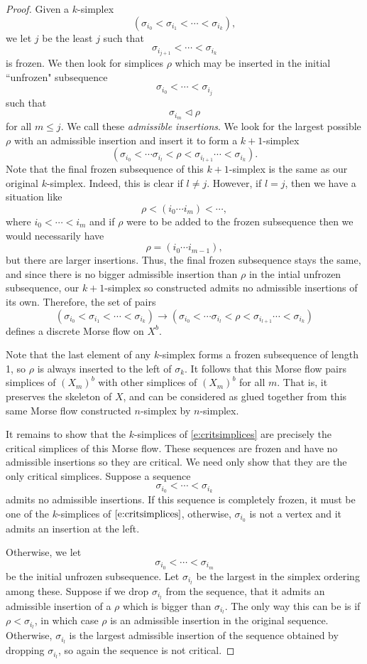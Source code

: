 \documentclass{article}
\theoremstyle{definition}
\begin{document}
\begin{proof}
Given a $k$-simplex
\[(\sigma_{i_0} < \sigma_{i_1} < \cdots < \sigma_{i_k}),\]
we let $j$ be the least $j$ such that
\[\sigma_{i_{j+1}} < \cdots < \sigma_{i_k}\]
is frozen. We then look for simplices $\rho$ which may be inserted in the initial ``unfrozen" subsequence
\[\sigma_{i_0} < \cdots < \sigma_{i_j}\]
such that
\[\sigma_{i_m} \lhd \rho\]
for all $m\le j$. We call these \emph{admissible insertions}. We look for the largest possible $\rho$ with an admissible insertion and insert it to form a $k+1$-simplex
\[(\sigma_{i_0} < \cdots \sigma_{i_l} < \rho < \sigma_{i_{l+1}} \cdots < \sigma_{i_k}).\]
Note that the final frozen subsequence of this $k+1$-simplex is the same as our original $k$-simplex. Indeed, this is clear if $l \neq j$. However, if $l = j$, then we have a situation like
\[\rho < (i_0 \cdots i_m) < \cdots,\]
where $i_0 < \cdots < i_m$ and if $\rho$ were to be added to the frozen subsequence then we would necessarily have
\[\rho = (i_0 \cdots i_{m-1}),\]
but there are larger insertions. Thus, the final frozen subsequence stays the same, and since there is no bigger admissible insertion than $\rho$ in the intial unfrozen subsequence, our $k+1$-simplex so constructed admits no admissible insertions of its own. Therefore, the set of pairs
\[(\sigma_{i_0} < \sigma_{i_1} < \cdots < \sigma_{i_k}) \to (\sigma_{i_0} < \cdots \sigma_{i_l} < \rho < \sigma_{i_{l+1}} \cdots < \sigma_{i_k})\]
defines a discrete Morse flow on $X^b$.

Note that the last element of any $k$-simplex forms a frozen subsequence of length 1, so $\rho$ is always inserted to the left of $\sigma_k$. It follows that this Morse flow pairs simplices of $(X_m)^b$ with other simplices of $(X_m)^b$ for all $m$. That is, it preserves the skeleton of $X$, and can be considered as glued together from this same Morse flow constructed $n$-simplex by $n$-simplex.

It remains to show that the $k$-simplices of \eqref{e:critsimplices} are precisely the critical simplices of this Morse flow. These sequences are frozen and have no admissible insertions so they are critical. We need only show that they are the only critical simplices. Suppose a sequence
\[\sigma_{i_0} < \cdots < \sigma_{i_k}\]
admits no admissible insertions. If this sequence is completely frozen, it must be one of the $k$-simplices of $\eqref{e:critsimplices}$, otherwise, $\sigma_{i_0}$ is not a vertex and it admits an insertion at the left. 

Otherwise, we let
\[\sigma_{i_0} < \cdots < \sigma_{i_m}\]
be the initial unfrozen subsequence. Let $\sigma_{i_l}$ be the largest in the simplex ordering among these. Suppose if we drop $\sigma_{i_l}$ from the sequence, that it admits an admissible insertion of a $\rho$ which is bigger than $\sigma_{i_l}$. The only way this can be is if $\rho < \sigma_{i_l}$, in which case $\rho$ is an admissible insertion in the original sequence. Otherwise, $\sigma_{i_l}$ is the largest admissible insertion of the sequence obtained by dropping $\sigma_{i_l}$, so again the sequence is not critical.


\end{proof}
\end{document}
